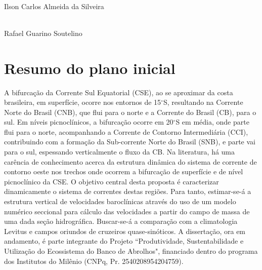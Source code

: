 \documentclass[12pt,portuguese,a4paper,pdftex]{article}
\begin{document}
\vspace{6cm}

\begin{center}

\underline{\hspace{10cm}}\vspace{0.3cm}\\
Ilson Carlos Almeida da Silveira

\vspace{3cm}

\underline{\hspace{10cm}}\vspace{0.3cm}\\
Rafael Guarino Soutelino

\end{center}


\newpage
{}
\tableofcontents



\newpage
\section*{Resumo do plano inicial}
\pagestyle{plain}

\hspace{4mm}  A bifurca\c c\~ao da Corrente Sul Equatorial (CSE), ao se aproximar da
costa brasileira, em superfície, ocorre nos entornos de 15$^\circ$S, resultando
 na Corrente Norte do Brasil (CNB), que flui para o norte e a
Corrente do Brasil (CB), para o sul. Em n\'iveis picnocl\'inicos, a
bifurca\c c\~ao ocorre em 20$^\circ$S em m\'edia, onde parte flui para
o norte, acompanhando a Corrente de Contorno Intermedi\'aria (CCI),
contribuindo com a forma\c c\~ao da Sub-corrente Norte do Brasil
(SNB), e parte vai para o sul, espessando verticalmente o fluxo da CB.
Na literatura, h\'a uma car\^encia de conhecimento acerca da
estrutura din\^amica do sistema de corrente de contorno oeste nos
trechos onde ocorrem a bifurca\c c\~ao de superfície e de nível picnoclínico da CSE.  O objetivo central desta
proposta \'e caracterizar dinamicamente o sistema de correntes destas
regi\~oes. Para tanto, estimar-se-á a estrutura vertical de
velocidades barocl\'inicas atrav\'es do uso de um modelo num\'erico
seccional para cálculo das velocidades a partir do campo
de massa de uma dada se\c c\~ao hidrogr\'afica. Buscar-se-á a comparação
com a climatologia Levitus \citep{boyler_etal2005} e campos oriundos de cruzeiros quase-sinóticos.  
A dissertação, ora em andamento, é parte integrante do Projeto ``Produtividade, 
Sustentabilidade e Utilização do Ecossistema do Banco de Abrolhos", 
financiado dentro do programa dos Institutos do Milênio (CNPq, Pr. 
2540208954204759).
\end{document}
